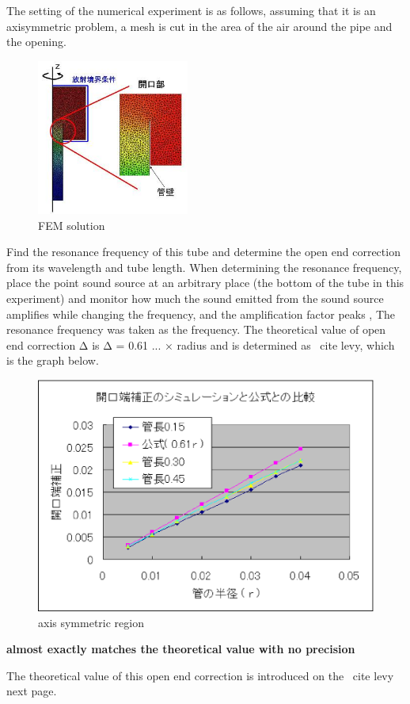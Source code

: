 The setting of the numerical experiment is as follows, assuming that it is an axisymmetric problem, a mesh is cut in the area of ​​the air around the pipe and the opening.


\begin{figure}[tbp]
\begin{center}
\includegraphics[bb=0 0 200 200,width=5cm]{images/fem_analysis_condition.jpg}
\caption{FEM solution}
\end{center}
\end{figure}


Find the resonance frequency of this tube and determine the open end correction from its wavelength and tube length. When determining the resonance frequency, place the point sound source at an arbitrary place (the bottom of the tube in this experiment) and monitor how much the sound emitted from the sound source amplifies while changing the frequency, and the amplification factor peaks , The resonance frequency was taken as the frequency.
The theoretical value of open end correction Δ is Δ = 0.61 ... × radius and is determined as \ cite {levy}, which is the graph below.


\begin{figure}[tbp]
\begin{center}
\includegraphics[width=\hsize]{images/compare_open_end_modify.eps}
\caption{axis symmetric region}
\end{center}
\end{figure}

{\bf almost exactly matches the theoretical value with no precision}

The theoretical value of this open end correction is introduced on the \ cite {levy} next page.




